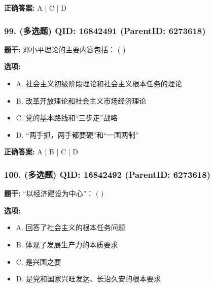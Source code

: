 \documentclass[12pt,UTF8]{ctexart}
\begin{document}
\textbf{正确答案:}
A | C | D

\vspace{0.3em}\hrulefill\vspace{0.7em}

\subsubsection*{99. (多选题) \small QID: 16842491 (ParentID: 6273618)}

\textbf{题干:}
邓小平理论的主要内容包括： ( )



\textbf{选项:}
\begin{itemize}[leftmargin=*]

  \item A. 社会主义初级阶段理论和社会主义根本任务的理论

  \item B. 改革开放理论和社会主义市场经济理论

  \item C. 党的基本路线和“三步走”战略

  \item D. “两手抓，两手都要硬”和“一国两制”

\end{itemize}

\textbf{正确答案:}
A | B | C | D

\vspace{0.3em}\hrulefill\vspace{0.7em}

\subsubsection*{100. (多选题) \small QID: 16842492 (ParentID: 6273618)}

\textbf{题干:}
“以经济建设为中心”： ( )



\textbf{选项:}
\begin{itemize}[leftmargin=*]

  \item A. 回答了社会主义的根本任务问题

  \item B. 体现了发展生产力的本质要求

  \item C. 是兴国之要

  \item D. 是党和国家兴旺发达、长治久安的根本要求

\end{itemize}
\end{document}
